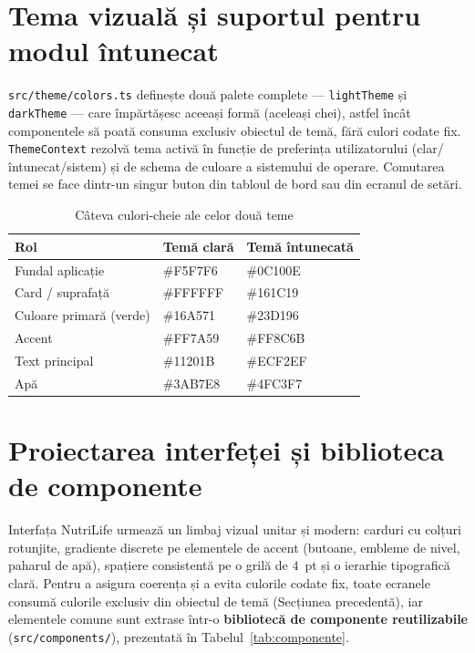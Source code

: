 \documentclass[12pt, a4paper, twoside]{report}
\numberwithin{equation}{section}
\begin{document}
\section{Tema vizuală și suportul pentru modul întunecat}

\texttt{src/\allowbreak theme/\allowbreak colors.ts} definește două palete complete --- \texttt{lightTheme} și
\texttt{darkTheme} --- care împărtășesc aceeași formă (aceleași chei), astfel încât
componentele să poată consuma exclusiv obiectul de temă, fără culori codate fix.
\texttt{ThemeContext} rezolvă tema activă în funcție de preferința utilizatorului
(clar/întunecat/sistem) și de schema de culoare a sistemului de operare. Comutarea temei se
face dintr-un singur buton din tabloul de bord sau din ecranul de setări.

\begin{table}[H]
\centering
\caption{Câteva culori-cheie ale celor două teme}
\label{tab:teme}
\begin{tabularx}{\textwidth}{lXX}
\toprule
\textbf{Rol} & \textbf{Temă clară} & \textbf{Temă întunecată} \\
\midrule
Fundal aplicație & \#F5F7F6 & \#0C100E \\
Card / suprafață & \#FFFFFF & \#161C19 \\
Culoare primară (verde) & \#16A571 & \#23D196 \\
Accent & \#FF7A59 & \#FF8C6B \\
Text principal & \#11201B & \#ECF2EF \\
Apă & \#3AB7E8 & \#4FC3F7 \\
\bottomrule
\end{tabularx}
\end{table}

\section{Proiectarea interfeței și biblioteca de componente}

Interfața NutriLife urmează un limbaj vizual unitar și modern: carduri cu colțuri rotunjite,
gradiente discrete pe elementele de accent (butoane, embleme de nivel, paharul de apă),
spațiere consistentă pe o grilă de $4$~pt și o ierarhie tipografică clară. Pentru a asigura
coerența și a evita culorile codate fix, toate ecranele consumă culorile exclusiv din obiectul
de temă (Secțiunea precedentă), iar elementele comune sunt extrase într-o \textbf{bibliotecă de
componente reutilizabile} (\texttt{src/\allowbreak components/}), prezentată în Tabelul~\ref{tab:componente}.
\end{document}
